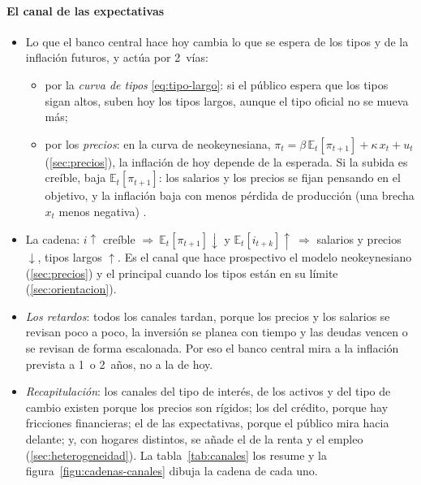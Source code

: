\documentclass[11pt]{article}
\begin{document}
\paragraph{El canal de las expectativas}
\begin{itemize}
\item Lo que el banco central hace hoy cambia lo que se espera de los tipos y de la inflación futuros, y actúa por 2~vías:
  \begin{itemize}
  \item por la \emph{curva de tipos} \eqref{eq:tipo-largo}: si el público espera que los tipos sigan altos, suben hoy los tipos largos, aunque el tipo oficial no se mueva más;
  \item por los \emph{precios}: en la curva de  neokeynesiana, $\pi_t=\beta\,\mathbb{E}_t[\pi_{t+1}]+\kappa\,x_t+u_t$ (\ref{sec:precios}), la inflación de hoy depende de la esperada. Si la subida es creíble, baja $\mathbb{E}_t[\pi_{t+1}]$: los salarios y los precios se fijan pensando en el objetivo, y la inflación baja con menos pérdida de producción (una brecha $x_t$ menos negativa) .
  \end{itemize}
\item La cadena: $i\uparrow$ creíble $\Rightarrow\ \mathbb{E}_t[\pi_{t+1}]\downarrow$ y $\mathbb{E}_t[i_{t+k}]\uparrow\ \Rightarrow$ salarios y precios $\downarrow$, tipos largos $\uparrow$. Es el canal que hace prospectivo el modelo neokeynesiano (\ref{sec:precios}) y el principal cuando los tipos están en su límite (\ref{sec:orientacion}).
\end{itemize}

\begin{itemize}
\item \emph{Los retardos}: todos los canales tardan, porque los precios y los salarios se revisan poco a poco, la inversión se planea con tiempo y las deudas vencen o se revisan de forma escalonada. Por eso el banco central mira a la inflación prevista a 1~o 2~años, no a la de hoy.
\item \emph{Recapitulación}: los canales del tipo de interés, de los activos y del tipo de cambio existen porque los precios son rígidos; los del crédito, porque hay fricciones financieras; el de las expectativas, porque el público mira hacia delante; y, con hogares distintos, se añade el de la renta y el empleo (\ref{sec:heterogeneidad}). La tabla~\ref{tab:canales} los resume y la figura~\ref{figu:cadenas-canales} dibuja la cadena de cada uno.
\end{itemize}
\end{document}
